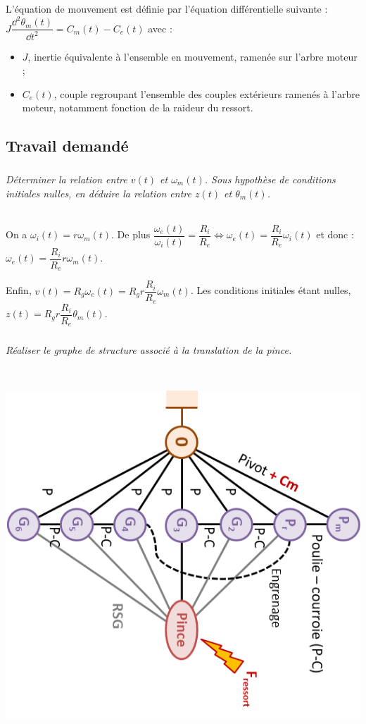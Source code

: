 \documentclass[10pt,fleqn]{article} %
\begin{document}
\begin{multicols}{2}
L’équation de mouvement est définie par l’équation différentielle suivante : $J\dfrac{\dd^2 \theta_m(t)}{\dd t^2}=C_m(t)-C_e(t)$  avec :
\begin{itemize}
\item $J$, inertie équivalente à l’ensemble en mouvement, ramenée sur l’arbre moteur ;
\item $C_e(t)$, couple regroupant l’ensemble des couples extérieurs ramenés à l’arbre moteur, notamment fonction de la raideur du ressort.
\end{itemize}




\subsection*{Travail demandé}


\subparagraph{}\textit{Déterminer la relation entre $v(t)$ et $\omega_m(t)$. Sous hypothèse de conditions initiales nulles, en déduire la relation entre $z(t)$ et $\theta_m(t)$.}
\ifprof
\begin{corrige} ~\\
On a $\omega_i(t) = r\omega_m(t)$. De plus $\dfrac{\omega_e(t)}{\omega_i(t)}=\dfrac{R_i}{R_e} \Longleftrightarrow \omega_e(t)=\dfrac{R_i}{R_e}\omega_i(t)$ et donc :
$\omega_e(t)=\dfrac{R_i}{R_e}r\omega_m(t)$.

Enfin, $v(t)=R_g \omega_e(t) =R_g r \dfrac{R_i}{R_e}\omega_m(t)$. Les conditions initiales étant nulles, $z(t)=R_g r \dfrac{R_i}{R_e}\theta_m(t)$. 
\end{corrige}
\else
\fi


\subparagraph{}\textit{Réaliser le graphe de structure associé à la translation de la pince.}
\ifprof
\begin{corrige} ~\\
\begin{center}
\includegraphics[width=.7\linewidth]{images/fig_07}
\end{center}


\end{corrige}
\end{multicols}
\end{document}
